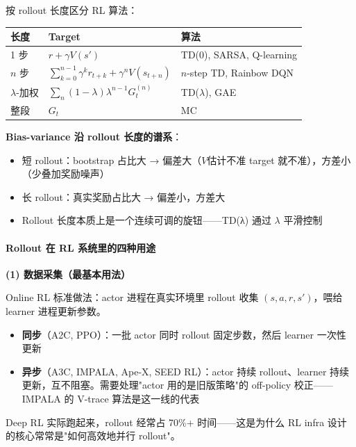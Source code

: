 \documentclass[11pt,a4paper]{article}
\theoremstyle{definition}
\begin{document}
\begin{keypoint}
按 rollout 长度区分 RL 算法：
\begin{center}
\begin{tabular}{l|l|l}
\toprule
长度 & Target & 算法 \\
\midrule
1 步 & $r + \gamma V(s')$ & TD(0), SARSA, Q-learning \\
$n$ 步 & $\sum_{k=0}^{n-1}\gamma^k r_{t+k} + \gamma^n V(s_{t+n})$ & $n$-step TD, Rainbow DQN \\
$\lambda$-加权 & $\sum_n (1-\lambda)\lambda^{n-1}G_t^{(n)}$ & TD($\lambda$), GAE \\
整段 & $G_t$ & MC \\
\bottomrule
\end{tabular}
\end{center}

\textbf{Bias-variance 沿 rollout 长度的谱系}：
\begin{itemize}
\item 短 rollout：bootstrap 占比大 → 偏差大（$V$估计不准 target 就不准），方差小（少叠加奖励噪声）
\item 长 rollout：真实奖励占比大 → 偏差小，方差大
\item Rollout 长度本质上是一个连续可调的旋钮——TD(λ) 通过 $\lambda$ 平滑控制
\end{itemize}
\end{keypoint}

\paragraph{Rollout 在 RL 系统里的四种用途}

\textbf{(1) 数据采集（最基本用法）}

Online RL 标准做法：actor 进程在真实环境里 rollout 收集 $(s, a, r, s')$，喂给 learner 进程更新参数。

\begin{itemize}
\item \textbf{同步}（A2C, PPO）：一批 actor 同时 rollout 固定步数，然后 learner 一次性更新
\item \textbf{异步}（A3C, IMPALA, Ape-X, SEED RL）：actor 持续 rollout、learner 持续更新，互不阻塞。需要处理"actor 用的是旧版策略"的 off-policy 校正——IMPALA 的 V-trace 算法是这一线的代表
\end{itemize}

Deep RL 实际跑起来，rollout 经常占 70\%+ 时间——这是为什么 RL infra 设计的核心常常是"如何高效地并行 rollout"。
\end{document}
